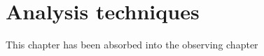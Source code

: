 \documentclass[a4paper,oneside,12pt, class=Latex/Classes/PhDthesisPSnPDF, crop=false]{standalone}
\begin{document}
\doublespacing
\chapter{Analysis techniques}
\label{chap:analysis}


\color{red} This chapter has been absorbed into the observing chapter \color{black}
\end{document}
